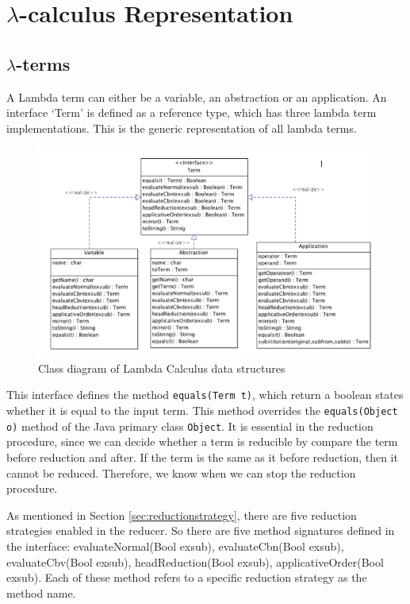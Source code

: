 \documentclass[a4paper,11pt,twoside]{report}
\begin{document}
\section{$\lambda$-calculus Representation}
\subsection{$\lambda$-terms}
A Lambda term can either be a variable, an abstraction or an application. An interface `Term' is defined as a reference type, which has three lambda term implementations. This is the generic representation of all lambda terms.

\begin{figure}[ht]
\centering
\includegraphics[scale=0.7]{Term}
\caption{Class diagram of Lambda Calculus data structures}
\label{fig:term1}
\end{figure}

This interface defines the method \verb|equals(Term t)|, which return a boolean states whether it is equal to the input term. This method overrides the \verb|equals(Object o)| method of the Java primary class \verb|Object|. It is essential in the reduction procedure, since we can decide whether a term is reducible by compare the term before reduction and after. If the term is the same as it before reduction, then it cannot be reduced. Therefore, we know when we can stop the reduction procedure.  

As mentioned in Section \ref{sec:reductionstrategy}, there are five reduction strategies enabled in the reducer. So there are five method signatures defined in the interface: \textsf{evaluateNormal(Bool exsub), evaluateCbn(Bool exsub), evaluateCbv(Bool exsub), headReduction(Bool exsub), applicativeOrder(Bool exsub)}. Each of these method refers to a specific reduction strategy as the method name. 
\end{document}
